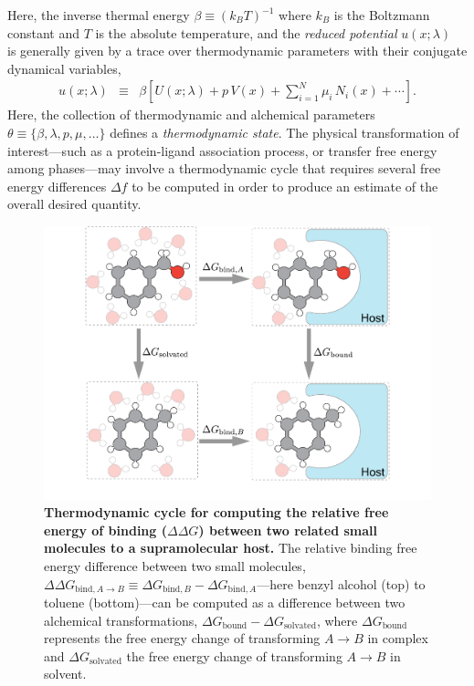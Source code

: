 \documentclass[9pt,bestpractices]{livecoms}
\begin{document}
Here, the inverse thermal energy $\beta \equiv (k_B T)^{-1}$ where $k_B$ is the Boltzmann constant and $T$ is the absolute temperature, and the \emph{reduced potential} $u(x; \lambda)$~\cite{shirts2008statistically} is generally given by a trace over thermodynamic parameters with their conjugate dynamical variables,
\begin{eqnarray}
u(x;\lambda) &\equiv& \beta \left[ U(x;\lambda) + p \, V(x) + \sum_{i=1}^N \mu_i \, N_i(x) + \cdots \right] . \label{equation:reduced-potential}
\end{eqnarray}
Here, the collection of thermodynamic and alchemical parameters $\theta \equiv \{\beta, \lambda, p, \mu, \ldots\}$ defines a \emph{thermodynamic state}.
The physical transformation of interest---such as a protein-ligand association process, or transfer free energy among phases---may involve a thermodynamic cycle that requires several free energy differences $\Delta f$ to be computed in order to produce an estimate of the overall desired quantity.

\begin{figure}
    \includegraphics[width=0.95\columnwidth]{paper/figures/fig2/Fig2.pdf}
    \caption{{\bf Thermodynamic cycle for computing the relative free energy of binding ($\Delta \Delta G$) between two related small molecules to a supramolecular host.}
    The relative binding free energy difference between two small molecules, $\Delta \Delta G_{\mathrm{bind}, A \rightarrow B} \equiv \Delta G_{\mathrm{bind}, B} - \Delta G_{\mathrm{bind}, A}$---here benzyl alcohol (top) to toluene (bottom)---can be computed as a difference between two alchemical transformations, $\Delta G_\mathrm{bound} - \Delta G_\mathrm{solvated}$, where $\Delta G_\mathrm{bound}$ represents the free energy change of transforming $A \rightarrow B$ in complex and $\Delta G_\mathrm{solvated}$ the free energy change of transforming $A \rightarrow B$ in solvent.}
    \label{fig:binding-thermodynamic-cycle}
\end{figure}
\end{document}
